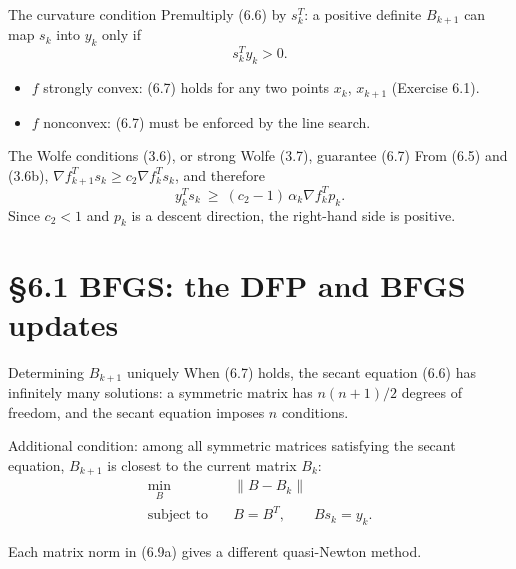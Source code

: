 \documentclass[aspectratio=169,12pt]{beamer}
\newcommand{\gradf}{\nabla f}
\begin{document}
\begin{frame}{The curvature condition}
  Premultiply (6.6) by $s_{k}^{T}$: a positive definite $B_{k+1}$ can map $s_{k}$ into $y_{k}$ only if
  \[ s_{k}^{T}y_{k}>0 . \tag{6.7} \]

  \begin{itemize}\setlength\itemsep{0.3em}
    \item $f$ strongly convex: (6.7) holds for any two points $x_{k}$, $x_{k+1}$ (Exercise 6.1).
    \item $f$ nonconvex: (6.7) must be enforced by the line search.
  \end{itemize}

  \vspace{0.2em}
  \begin{alertblock}{The Wolfe conditions (3.6), or strong Wolfe (3.7), guarantee (6.7)}
    From (6.5) and (3.6b), $\gradf_{k+1}^{T}s_{k}\ge c_{2}\gradf_{k}^{T}s_{k}$, and therefore
    \[ y_{k}^{T}s_{k}\ \ge\ (c_{2}-1)\,\alpha_{k}\gradf_{k}^{T}p_{k} . \tag{6.8} \]
    Since $c_{2}<1$ and $p_{k}$ is a descent direction, the right-hand side is positive.
  \end{alertblock}
\end{frame}

\section{\S6.1 BFGS: the DFP and BFGS updates}

\begin{frame}{Determining $B_{k+1}$ uniquely}
  When (6.7) holds, the secant equation (6.6) has infinitely many solutions: a symmetric
  matrix has $n(n+1)/2$ degrees of freedom, and the secant equation imposes $n$ conditions.

  \vspace{0.7em}
  Additional condition: among all symmetric matrices satisfying the secant equation,
  $B_{k+1}$ is \alert{closest to the current matrix $B_{k}$}:
  \begin{align}
    \min_{B}\quad & \|B-B_{k}\| \tag{6.9a}\\
    \text{subject to}\quad & B=B^{T},\qquad Bs_{k}=y_{k} . \tag{6.9b}
  \end{align}

  \vspace{0.3em}
  Each matrix norm in (6.9a) gives a different quasi-Newton method.
\end{frame}
\end{document}
